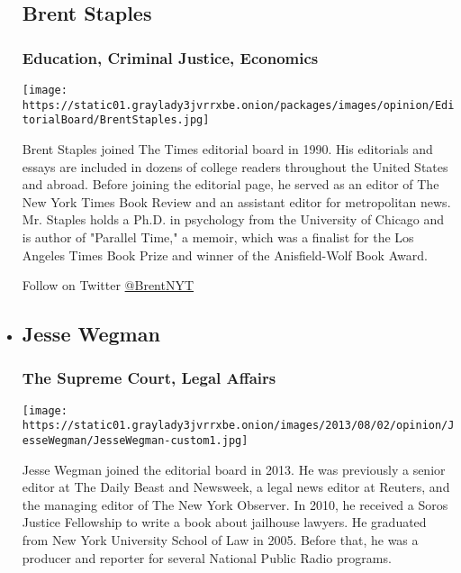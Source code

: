 \begin{itemize}
{  \subsection{Brent Staples}\label{brent-staples}}

  \hypertarget{education-criminal-justice-economics}{%
  \subsubsection{Education, Criminal Justice,
  Economics}\label{education-criminal-justice-economics}}

  \texttt{[image: https://static01.graylady3jvrrxbe.onion/packages/images/opinion/EditorialBoard/BrentStaples.jpg]}

  Brent Staples joined The Times editorial board in 1990. His editorials
  and essays are included in dozens of college readers throughout the
  United States and abroad. Before joining the editorial page, he served
  as an editor of The New York Times Book Review and an assistant editor
  for metropolitan news. Mr. Staples holds a Ph.D. in psychology from
  the University of Chicago and is author of "Parallel Time," a memoir,
  which was a finalist for the Los Angeles Times Book Prize and winner
  of the Anisfield-Wolf Book Award.

  Follow on Twitter \href{http://twitter.com/BrentNYT}{@BrentNYT}
\item
  \hypertarget{jesse-wegman}{%
  \subsection{Jesse Wegman}\label{jesse-wegman}}

  \hypertarget{the-supreme-court-legal-affairs}{%
  \subsubsection{The Supreme Court, Legal
  Affairs}\label{the-supreme-court-legal-affairs}}

  \texttt{[image: https://static01.graylady3jvrrxbe.onion/images/2013/08/02/opinion/JesseWegman/JesseWegman-custom1.jpg]}

  Jesse Wegman joined the editorial board in 2013. He was previously a
  senior editor at The Daily Beast and Newsweek, a legal news editor at
  Reuters, and the managing editor of The New York Observer. In 2010, he
  received a Soros Justice Fellowship to write a book about jailhouse
  lawyers. He graduated from New York University School of Law in 2005.
  Before that, he was a producer and reporter for several National
  Public Radio programs.


\end{itemize}
